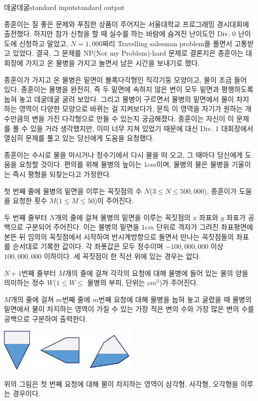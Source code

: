 \begin{problem}{데굴데굴}{standard input}{standard output}

종훈이는 질 좋은 문제와 푸짐한 상품이 주어지는 서울대학교 프로그래밍 경시대회에 출전했다. 하지만 참가 신청을 할 때 실수를 하는 바람에 숨겨진 난이도인 Div. 0 난이도에 신청하고 말았고, $N = 1,000$짜리 Travelling salesman problem을 풀면서 고통받고 있었다. 결국, 그 문제를 NP(Not my Problem)-hard 문제로 결론지은 종훈이는 대회장에 가지고 온 물병을 가지고 놀면서 남은 시간을 보내기로 했다.

종훈이가 가지고 온 물병은 밑면이 볼록다각형인 직각기둥 모양이고, 물이 조금 들어 있다. 종훈이는 물병을 완전히, 즉 두 밑면에 속하지 않은 변이 모두 밑면과 평행하도록 눕혀 놓고 데굴데굴 굴려 보았다. 그리고 물병이 구르면서 물병의 밑면에서 물이 차지하는 영역이 다양한 모양으로 바뀌는 걸 지켜보다가, 문득 이 영역을 자기가 원하는 개수만큼의 변을 가진 다각형으로 만들 수 있는지 궁금해졌다. 종훈이는 자신이 이 문제를 풀 수 있을 거라 생각했지만, 이미 너무 지쳐 있었기 때문에 대신 Div. 1 대회장에서 열심히 문제를 풀고 있는 당신에게 도움을 요청했다.

종훈이는 수시로 물을 마시거나 정수기에서 다시 물을 떠 오고, 그 때마다 당신에게 도움을 요청할 것이다. 편의를 위해 물병의 높이는 $1cm$이며, 물병의 물은 물병을 기울이는 즉시 평형을 되찾는다고 가정한다.

\InputFile
첫 번째 줄에 물병의 밑면을 이루는 꼭짓점의 수 $N$($3 \le N \le 500,000$), 종훈이가 도움을 요청한 횟수 $M$($1 \le M \le 50$)이 주어진다.

두 번째 줄부터 $N$개의 줄에 걸쳐 물병의 밑면을 이루는 꼭짓점의 $x$ 좌표와 $y$ 좌표가 공백으로 구분되어 주어진다. 이는 물병의 밑면을 $1cm$ 단위로 격자가 그려진 좌표평면에 본뜬 뒤 임의의 꼭짓점에서 시작하여 반시계방향으로 돌면서 만나는 꼭짓점들의 좌표를 순서대로 기록한 값이다. 각 좌푯값은 모두 정수이며 $-100,000,000$ 이상 $100,000,000$ 이하이다. 세 꼭짓점이 한 직선 위에 있는 경우는 없다.

$N + 1$번째 줄부터 $M$개의 줄에 걸쳐 각각의 요청에 대해 물병에 들어 있는 물의 양을 의미하는 정수 $W$($1 \le W \le$ 물병의 부피, 단위는 $cm^{3}$)가 주어진다.

\OutputFile
$M$개의 줄에 걸쳐 $m$번째 줄에 $m$번째 요청에 대해 물병을 눕혀 놓고 굴렸을 때 물병의 밑면에서 물이 차지하는 영역이 가질 수 있는 가장 적은 변의 수와 가장 많은 변의 수를 공백으로 구분하여 출력한다.

\Example

\begin{example}
%
\end{example}

\Notes
\begin{center}
  \includegraphics[width=0.5\textwidth]{roll.png}
\end{center}

위의 그림은 첫 번째 요청에 대해 물이 차지하는 영역이 삼각형, 사각형, 오각형을 이루는 경우이다.

\end{problem}

